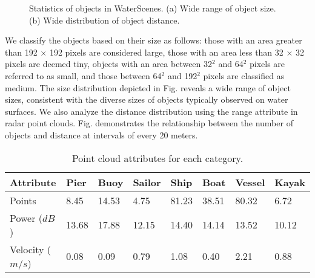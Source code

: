 \documentclass[lettersize,journal]{IEEEtran}
\begin{document}
\begin{figure}[h]
\centering
{}
\quad
\hspace{-6mm}
\caption{Statistics of objects in WaterScenes. (a) Wide range of object size. (b) Wide distribution of object distance.}
\label{fig:statistics}
\end{figure}

We classify the objects based on their size as follows: those with an area greater than 192 $\times$ 192 pixels are considered large, those with an area less than 32 $\times$ 32 pixels are deemed tiny, objects with an area between 32$^2$ and 64$^2$ pixels are referred to as small, and those between 64$^2$ and 192$^2$ pixels are classified as medium.
The size distribution depicted in Fig.  reveals a wide range of object sizes, consistent with the diverse sizes of objects typically observed on water surfaces. 
We also analyze the distance distribution using the range attribute in radar point clouds. Fig.  demonstrates the relationship between the number of objects and distance at intervals of every 20 meters.

\begin{table}[htbp]
\caption{Point cloud attributes for each category.}
\setlength\tabcolsep{4pt}
\center
\footnotesize
\begin{tabular*}{\linewidth}{p{1.8cm}<{}|p{0.6cm}<{\centering}p{0.7cm}<{\centering}p{0.7cm}<{\centering}p{0.7cm}<{\centering}p{0.7cm}<{\centering}p{0.7cm}<{\centering}p{0.7cm}<{\centering}}
\toprule
\bf{Attribute} & \bf{Pier} & \bf{Buoy} & \bf{Sailor} & \bf{Ship} & \bf{Boat} & \bf{Vessel} & \bf{Kayak}  \\\midrule
Points & 8.45 & 14.53 & 4.75 & 81.23 & 38.51 & 80.32 & 6.72\\
Power ($dB$)& 13.68 & 17.88 & 12.15 & 14.40 & 14.14 & 13.52 & 10.12   \\
Velocity ($m/s$) & 0.08 & 0.09 & 0.79 & 1.08 & 0.40 & 2.21 & 0.88\\
\bottomrule
\end{tabular*}
\label{tab:radar-statistics}
\end{table}
\end{document}

